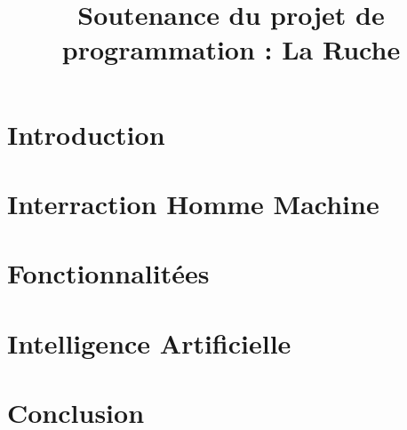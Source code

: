 \documentclass{beamer}
\title{Soutenance du projet de programmation : La Ruche}
\begin{document}
\section{Introduction}

\section{Interraction Homme Machine}

\section{Fonctionnalit\'ees}

\section{Intelligence Artificielle}

\section{Conclusion}
\end{document}
